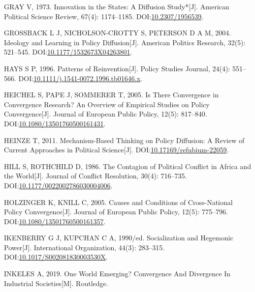 \documentclass[
  12pt,
]{ctexart}
\newlength{\cslhangindent}
\newlength{\cslentryspacingunit} %
\newenvironment{CSLReferences}[2] %
 {%
  \setlength{\parindent}{0pt}
  \ifodd #1
  \let\oldpar\par
  \def\par{\hangindent=\cslhangindent\oldpar}
  \fi
  \setlength{\parskip}{#2\cslentryspacingunit}
 }%
 {}
\begin{document}
\begin{CSLReferences}{1}{0}
\leavevmode{}%
GRAY V, 1973. Innovation in the {States}: {A Diffusion Study}*{[}J{]}. American Political Science Review, 67(4): 1174--1185. DOI:\href{https://doi.org/10.2307/1956539}{10.2307/1956539}.

\leavevmode{}%
GROSSBACK L J, NICHOLSON-CROTTY S, PETERSON D A M, 2004. Ideology and {Learning} in {Policy Diffusion}{[}J{]}. American Politics Research, 32(5): 521--545. DOI:\href{https://doi.org/10.1177/1532673X04263801}{10.1177/1532673X04263801}.

\leavevmode{}%
HAYS S P, 1996. Patterns of {Reinvention}{[}J{]}. Policy Studies Journal, 24(4): 551--566. DOI:\href{https://doi.org/10.1111/j.1541-0072.1996.tb01646.x}{10.1111/j.1541-0072.1996.tb01646.x}.

\leavevmode{}%
HEICHEL S, PAPE J, SOMMERER T, 2005. Is There Convergence in Convergence Research? An Overview of Empirical Studies on Policy Convergence{[}J{]}. Journal of European Public Policy, 12(5): 817--840. DOI:\href{https://doi.org/10.1080/13501760500161431}{10.1080/13501760500161431}.

\leavevmode{}%
HEINZE T, 2011. Mechanism-Based Thinking on Policy Diffusion: A Review of Current Approaches in Political Science{[}J{]}. DOI:\href{https://doi.org/10.17169/refubium-22059}{10.17169/refubium-22059}.

\leavevmode{}%
HILL S, ROTHCHILD D, 1986. The {Contagion} of {Political Conflict} in {Africa} and the {World}{[}J{]}. Journal of Conflict Resolution, 30(4): 716--735. DOI:\href{https://doi.org/10.1177/0022002786030004006}{10.1177/0022002786030004006}.

\leavevmode{}%
HOLZINGER K, KNILL C, 2005. Causes and Conditions of Cross-National Policy Convergence{[}J{]}. Journal of European Public Policy, 12(5): 775--796. DOI:\href{https://doi.org/10.1080/13501760500161357}{10.1080/13501760500161357}.

\leavevmode{}%
IKENBERRY G J, KUPCHAN C A, 1990/ed. Socialization and Hegemonic Power{[}J{]}. International Organization, 44(3): 283--315. DOI:\href{https://doi.org/10.1017/S002081830003530X}{10.1017/S002081830003530X}.

\leavevmode{}%
INKELES A, 2019. One {World Emerging}? {Convergence And Divergence In Industrial Societies}{[}M{]}. {Routledge}.


\end{CSLReferences}
\end{document}

